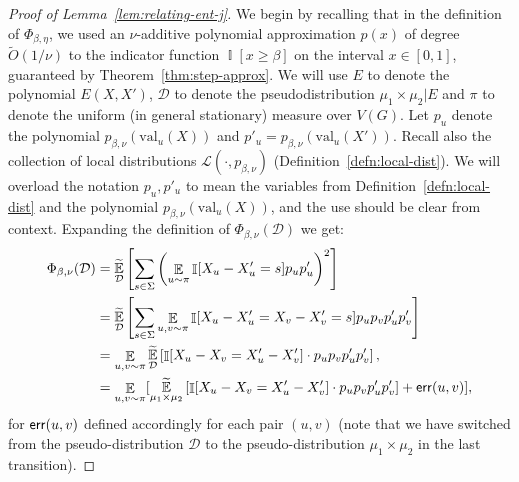 \documentclass[11pt]{article}
\DeclareMathOperator*{\E}{\mathbb{E}}
\DeclareMathOperator*{\pE}{\widetilde{\mathbb{E}}}
\DeclareMathOperator*{\Ind}{\mathbb{I}}
\def \cD {\mathcal{D}}
\def \cL {\mathcal{L}}
\def \val {\mathrm{val}}
\theoremstyle{definition}
\begin{document}
\begin{proof}[Proof of Lemma~\ref{lem:relating-ent-j}]
We begin by recalling that in the definition of $\Phi_{\beta,\eta}$, we used an $\nu$-additive polynomial approximation $p(x)$ of degree $\widetilde{O}(1/\nu)$ to the indicator function $\Ind[x \ge \beta]$ on the interval $x \in [0,1]$, guaranteed by Theorem~\ref{thm:step-approx}. We will use $E$ to denote the polynomial $E(X,X')$, $\cD$ to denote the pseudodistribution $\mu_1 \times \mu_2 | E$ and $\pi$ to denote the uniform (in general stationary) measure over $V(G)$. Let $p_u$ denote the polynomial $p_{\beta,\nu}(\val_u(X))$ and $p'_u = p_{\beta,\nu}(\val_u(X'))$. Recall also the collection of local distributions $\cL(\cdot, p_{\beta,\nu})$ (Definition~\ref{defn:local-dist}). We will overload the notation $p_u,p'_u$ to mean the variables from Definition~\ref{defn:local-dist} and the polynomial $p_{\beta,\nu}(\val_u(X))$, and the use should be clear from context. Expanding the definition of $\Phi_{\beta,\nu}(\cD)$ we get:
\begin{align}
    \Phi_{\beta,\nu}(\cD)
    &= \pE_{\cD}\left[\sum_{s \in \Sigma} \left(\E_{u \sim \pi} \Ind[X_u - X_u' = s]p_u p'_u\right)^2\right ] \nonumber\\
    &= \pE_{\cD}\left[\sum_{s \in \Sigma} \E_{u,v \sim \pi} \Ind[X_u - X_u' = X_v - X_v' = s]p_up_v p'_u p'_v \right]\nonumber\\
    &= \E_{u,v \sim \pi}\pE_{\cD}\left[ \Ind[X_u - X_v = X'_u- X'_v]\cdot p_u p_vp'_up'_v\right], \nonumber\\
    &= \E_{u,v\sim \pi}[\pE_{\mu_1 \times \mu_2}\left[ \Ind[X_u - X_v = X'_u- X'_v]\cdot p_u p_vp'_up'_v\right] + {\sf err}(u,v)],\label{eq:relating-potential}
\end{align}
for ${\sf err}(u,v)$ defined accordingly for each pair $(u,v)$ (note that we have switched from the pseudo-distribution $\mathcal{D}$ to the pseudo-distribution $\mu_1\times \mu_2$ in the last transition).


\end{proof}
\end{document}
